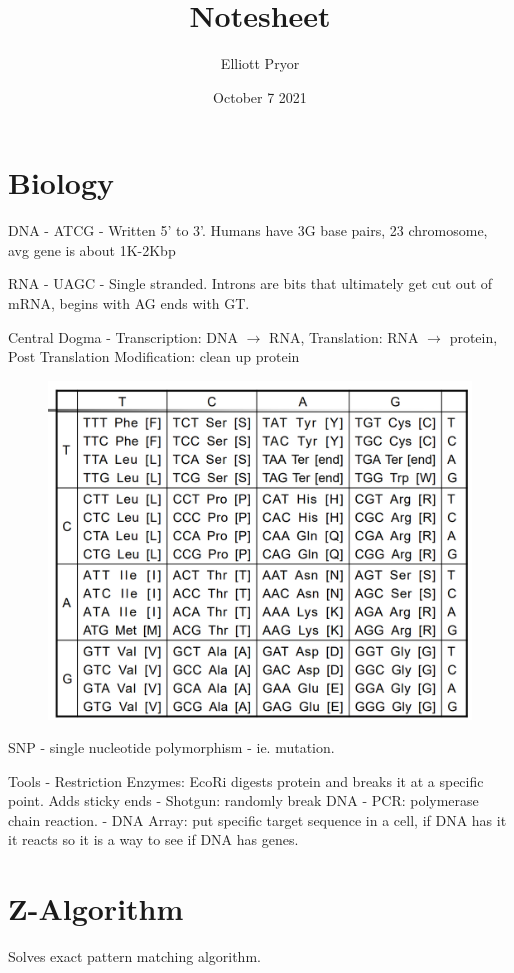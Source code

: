 \documentclass[10pt]{article}
\title{Notesheet}
\author{Elliott Pryor}
\date{October 7 2021}
\begin{document}

\section{Biology}

DNA - ATCG - Written 5' to 3'. 
Humans have 3G base pairs, 23 chromosome, avg gene is about 1K-2Kbp

RNA - UAGC - Single stranded. 
Introns are bits that ultimately get cut out of mRNA, begins with AG ends with GT.


Central Dogma - Transcription: DNA $\rightarrow$ RNA,
Translation: RNA $\rightarrow$ protein,
Post Translation Modification: clean up protein

\begin{figure}[H]
    \centering
    \includegraphics[width=0.7\linewidth]{proteins.png}
    \label{fig:proteins}
\end{figure}

SNP - single nucleotide polymorphism - ie. mutation.

Tools - Restriction Enzymes: EcoRi digests protein and breaks it at a specific point. 
Adds sticky ends - Shotgun: randomly break DNA - PCR: polymerase chain reaction.
- DNA Array: put specific target sequence in a cell, if DNA has it it reacts so it is a way to see if DNA has genes.


\section{Z-Algorithm}
Solves exact pattern matching algorithm.
\end{document}
